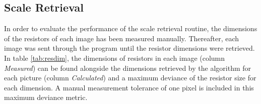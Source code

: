 \documentclass[10pt,twocolumn,letterpaper]{article}
\begin{document}
\subsection{Scale Retrieval}

In order to evaluate the performance of the scale retrieval routine, the dimensions of the resistors of each image has been measured manually. Thereafter, each image was sent through the program until the resistor dimensions were retrieved. In table \ref{tab:resdim}, the dimensions of resistors in each image (column \textit{Measured}) can be found alongside the dimensions retrieved by the algorithm for each picture (column \textit{Calculated}) and a maximum deviance of the resistor size for each dimension. A manual measurement tolerance of one pixel is included in this maximum deviance metric.
\par
\end{document}
